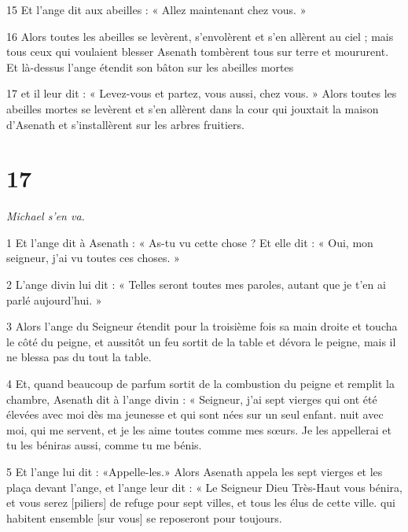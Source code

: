 \par 15 Et l'ange dit aux abeilles : « Allez maintenant chez vous. »

\par 16 Alors toutes les abeilles se levèrent, s'envolèrent et s'en allèrent au ciel ; mais tous ceux qui voulaient blesser Asenath tombèrent tous sur terre et moururent. Et là-dessus l'ange étendit son bâton sur les abeilles mortes

\par 17 et il leur dit : « Levez-vous et partez, vous aussi, chez vous. » Alors toutes les abeilles mortes se levèrent et s'en allèrent dans la cour qui jouxtait la maison d'Asenath et s'installèrent sur les arbres fruitiers.

\chapter{17}

\par \textit{Michael s'en va.}

\par 1 Et l'ange dit à Asenath : « As-tu vu cette chose ? Et elle dit : « Oui, mon seigneur, j'ai vu toutes ces choses. »

\par 2 L'ange divin lui dit : « Telles seront toutes mes paroles, autant que je t'en ai parlé aujourd'hui. »

\par 3 Alors l'ange du Seigneur étendit pour la troisième fois sa main droite et toucha le côté du peigne, et aussitôt un feu sortit de la table et dévora le peigne, mais il ne blessa pas du tout la table.

\par 4 Et, quand beaucoup de parfum sortit de la combustion du peigne et remplit la chambre, Asenath dit à l'ange divin : « Seigneur, j'ai sept vierges qui ont été élevées avec moi dès ma jeunesse et qui sont nées sur un seul enfant. nuit avec moi, qui me servent, et je les aime toutes comme mes sœurs. Je les appellerai et tu les béniras aussi, comme tu me bénis.

\par 5 Et l'ange lui dit : «Appelle-les.» Alors Asenath appela les sept vierges et les plaça devant l'ange, et l'ange leur dit : « Le Seigneur Dieu Très-Haut vous bénira, et vous serez [piliers] de refuge pour sept villes, et tous les élus de cette ville. qui habitent ensemble [sur vous] se reposeront pour toujours.

